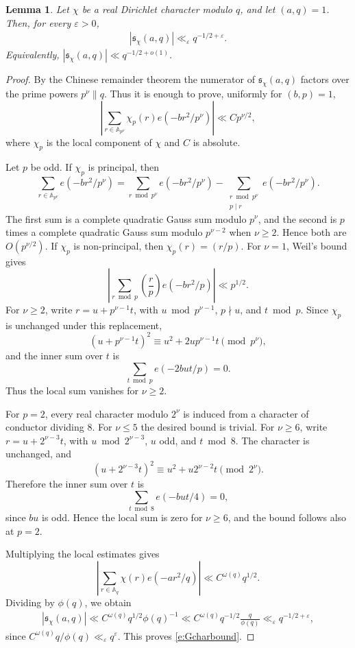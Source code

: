 \documentclass[12pt,reqno]{amsart}
\numberwithin{equation}{section}
\newtheorem{lemma}[equation]{Lemma}
\theoremstyle{definition}
\theoremstyle{remark}
\begin{document}
\begin{lemma}\label{l:Gcharbound}
Let \(\chi\) be a real Dirichlet character modulo \(q\), and let
\((a,q)=1\).  Then, for every \(\varepsilon>0\),
\begin{align}\label{e:Gcharbound}
 |\mathfrak s_\chi(a,q)|\ll_\varepsilon q^{-1/2+\varepsilon}.
\end{align}
Equivalently, \( |\mathfrak s_\chi(a,q)|\ll q^{-1/2+o(1)}\).
\end{lemma}

\begin{proof}
By the Chinese remainder theorem the numerator of \(\mathfrak s_\chi(a,q)\)
factors over the prime powers \(p^\nu\parallel q\).  Thus it is enough to
prove, uniformly for \((b,p)=1\),
\[
 \left|\sum_{r\in\mathbb A_{p^\nu}}\chi_p(r)e(-br^2/p^\nu)\right|
 \ll C p^{\nu/2},
\]
where \(\chi_p\) is the local component of \(\chi\) and \(C\) is absolute.

Let \(p\) be odd.  If \(\chi_p\) is principal, then
\[
 \sum_{r\in\mathbb A_{p^\nu}}e(-br^2/p^\nu)
 =
 \sum_{r\bmod p^\nu}e(-br^2/p^\nu)
 -
 \sum_{\substack{r\bmod p^\nu\\p\mid r}}e(-br^2/p^\nu).
\]
The first sum is a complete quadratic Gauss sum modulo \(p^\nu\), and the
second is \(p\) times a complete quadratic Gauss sum modulo \(p^{\nu-2}\)
when \(\nu\geq2\).  Hence both are \(O(p^{\nu/2})\).  If \(\chi_p\) is
non-principal, then \(\chi_p(r)=(r/p)\).  For \(\nu=1\), Weil's bound gives
\[
 \left|\sum_{r\bmod p}\left(\frac rp\right)e(-br^2/p)\right|
 \ll p^{1/2}.
\]
For \(\nu\geq2\), write \(r=u+p^{\nu-1}t\), with
\(u\bmod p^{\nu-1}\), \(p\nmid u\), and \(t\bmod p\).  Since \(\chi_p\) is
unchanged under this replacement,
\[
 (u+p^{\nu-1}t)^2\equiv u^2+2up^{\nu-1}t\pmod {p^\nu},
\]
and the inner sum over \(t\) is
\[
 \sum_{t\bmod p}e(-2but/p)=0.
\]
Thus the local sum vanishes for \(\nu\geq2\).

For \(p=2\), every real character modulo \(2^\nu\) is induced from a
character of conductor dividing \(8\).  For \(\nu\leq5\) the desired bound is
trivial.  For \(\nu\geq6\), write \(r=u+2^{\nu-3}t\), with
\(u\bmod 2^{\nu-3}\), \(u\) odd, and \(t\bmod 8\).  The character is
unchanged, and
\[
 (u+2^{\nu-3}t)^2\equiv u^2+u2^{\nu-2}t\pmod {2^\nu}.
\]
Therefore the inner sum over \(t\) is
\[
 \sum_{t\bmod 8}e(-but/4)=0,
\]
since \(bu\) is odd.  Hence the local sum is zero for \(\nu\geq6\), and the
bound follows also at \(p=2\).

Multiplying the local estimates gives
\[
 \left|\sum_{r\in\mathbb A_q}\chi(r)e(-ar^2/q)\right|
 \ll C^{\omega(q)}q^{1/2}.
\]
Dividing by \(\phi(q)\), we obtain
\begin{align}\label{e:actualboundfors}
     |\mathfrak s_\chi(a,q)|
 \ll C^{\omega(q)}q^{1/2}\phi(q)^{-1}
 \ll C^{\omega(q)}q^{-1/2}\frac q{\phi(q)}
 \ll_\varepsilon q^{-1/2+\varepsilon},
\end{align}
since \(C^{\omega(q)}q/\phi(q)\ll_\varepsilon q^\varepsilon\).  This proves
\eqref{e:Gcharbound}.
\end{proof}
\end{document}
